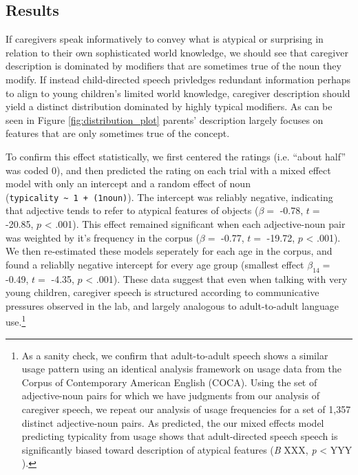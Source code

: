 \documentclass[10pt, letterpaper]{article}
\begin{document}
\hypertarget{results}{%
\subsection{Results}\label{results}}

If caregivers speak informatively to convey what is atypical or
surprising in relation to their own sophisticated world knowledge, we
should see that caregiver description is dominated by modifiers that are
sometimes true of the noun they modify. If instead child-directed speech
privledges redundant information perhaps to align to young children's
limited world knowledge, caregiver description should yield a distinct
distribution dominated by highly typical modifiers. As can be seen in
Figure \ref{fig:distribution_plot} parents' description largely focuses
on features that are only sometimes true of the concept.

To confirm this effect statistically, we first centered the ratings
(i.e. ``about half'' was coded 0), and then predicted the rating on each
trial with a mixed effect model with only an intercept and a random
effect of noun
(\texttt{typicality\ \textasciitilde{}\ 1\ +\ (1\textbar{}noun)}). The
intercept was reliably negative, indicating that adjective tends to
refer to atypical features of objects (\(\beta =\) -0.78, \(t =\)
-20.85, \(p\) \textless{} .001). This effect remained significant when
each adjective-noun pair was weighted by it's frequency in the corpus
(\(\beta =\) -0.77, \(t =\) -19.72, \(p\) \textless{} .001). We then
re-estimated these models seperately for each age in the corpus, and
found a reliablly negative intercept for every age group (smallest
effect \(\beta_{14} =\) -0.49, \(t =\) -4.35, \(p\) \textless{} .001).
These data suggest that even when talking with very young children,
caregiver speech is structured according to communicative pressures
observed in the lab, and largely analogous to adult-to-adult language
use.\footnote{As a sanity check, we confirm that adult-to-adult speech
  shows a similar usage pattern using an identical analysis framework on
  usage data from the Corpus of Contemporary American English (COCA).
  Using the set of adjective-noun pairs for which we have judgments from
  our analysis of caregiver speech, we repeat our analysis of usage
  frequencies for a set of 1,357 distinct adjective-noun pairs. As
  predicted, the our mixed effects model predicting typicality from
  usage shows that adult-directed speech speech is significantly biased
  toward description of atypical features (\emph{B} XXX, \emph{p}
  \textless{} YYY ).}
\end{document}
